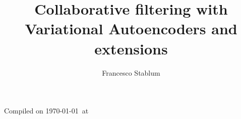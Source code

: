 \documentclass[12pt]{book}
\author{Francesco Stablum}
\title{Collaborative filtering with Variational Autoencoders and extensions}
\begin{document}
\maketitle
Compiled on \today\ at \currenttime
\tableofcontents










%
%

%
%
%
%
%
%
%
%
%
%
%
%
%
%
%
%
%
%
%
%


\end{document}
